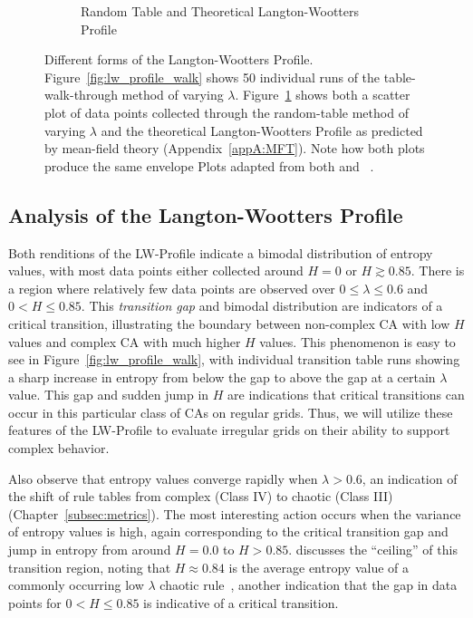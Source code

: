 \documentclass[a4paper,11pt]{report}
\begin{document}
\begin{figure}[htp]
\begin{subfigure}[t]{0.6\textwidth}
  \caption{Random Table and Theoretical Langton-Wootters Profile}
  \label{fig:lw_profile_rand}
  \end{subfigure}
\caption[The Langton-Wootters Profile]{
  Different forms of the Langton-Wootters Profile. Figure~\ref{fig:lw_profile_walk} shows 50 individual runs of the table-walk-through method of varying $\lambda$. Figure~\ref{fig:lw_profile_rand} shows both a scatter plot of data points collected through the random-table method of varying $\lambda$ and the theoretical Langton-Wootters Profile as predicted by mean-field theory (Appendix~\ref{appA:MFT}). Note how both plots produce the same envelope Plots adapted from both \citeauthor{la90} and \citeauthor{wo90}~\cite{la90,wo90}.
}
\label{fig:lw_profile}
\end{figure}

\subsection*{Analysis of the Langton-Wootters Profile}

Both renditions of the LW-Profile indicate a bimodal distribution of entropy values, with most data points either collected around $H=0$ or $H \gtrsim 0.85$. There is a region where relatively few data points are observed over $0 \le \lambda \le 0.6$ and $0 < H \le 0.85$. This \textit{transition gap} and bimodal distribution are indicators of a critical transition, illustrating the boundary between non-complex CA with low $H$ values and complex CA with much higher $H$ values. This phenomenon is easy to see in Figure~\ref{fig:lw_profile_walk}, with individual transition table runs showing a sharp increase in entropy from below the gap to above the gap at a certain $\lambda$ value. This gap and sudden jump in $H$ are indications that critical transitions can occur in this particular class of CAs on regular grids. Thus, we will utilize these features of the LW-Profile to evaluate irregular grids on their ability to support complex behavior. 

Also observe that entropy values converge rapidly when $\lambda > 0.6$, an indication of the shift of rule tables from complex (Class IV) to chaotic (Class III) (Chapter~\ref{subsec:metrics}). The most interesting action occurs when the variance of entropy values is high, again corresponding to the critical transition gap and jump in entropy from around $H=0.0$ to $H > 0.85$. \citeauthor{la90} discusses the ``ceiling'' of this transition region, noting that $H \approx 0.84$ is the average entropy value of a commonly occurring low $\lambda$ chaotic rule~\cite{la90}, another indication that the gap in data points for $0 < H \le 0.85$ is indicative of a critical transition.
\end{document}
